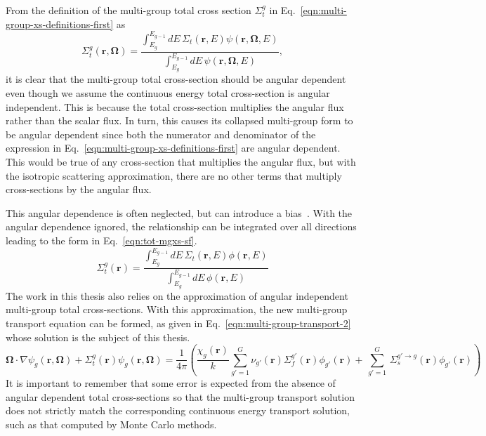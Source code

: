 \begin{appendices}
From the definition of the multi-group total cross section $\Sigma_{t}^g$ in Eq.~\ref{eqn:multi-group-xs-definitions-first} as 
\begin{equation}
\nonumber
\Sigma_{t}^g(\mathbf{r},\mathbf{\Omega}) = \frac{\int_{E_{g}}^{E_{g-1}} dE \, \Sigma_{t}(\mathbf{r},E)\psi(\mathbf{r},\mathbf{\Omega},E)}{\int_{E_{g}}^{E_{g-1}} dE \, \psi(\mathbf{r},\mathbf{\Omega},E)} ,
\end{equation}
it is clear that the multi-group total cross-section should be angular dependent even though we assume the continuous energy total cross-section is angular independent. This is because the total cross-section multiplies the angular flux rather than the scalar flux. In turn, this causes its collapsed multi-group form to be angular dependent since both the numerator and denominator of the expression in Eq.~\ref{eqn:multi-group-xs-definitions-first} are angular dependent. This would be true of any cross-section that multiplies the angular flux, but with the isotropic scattering approximation, there are no other terms that multiply cross-sections by the angular flux.

This angular dependence is often neglected, but can introduce a bias~\cite{gibson-preprint}. With the angular dependence ignored, the relationship can be integrated over all directions leading to the form in Eq.~\ref{eqn:tot-mgxs-sf}.
\begin{equation}
\Sigma_{t}^g(\mathbf{r}) = \frac{\int_{E_{g}}^{E_{g-1}} dE \, \Sigma_{t}(\mathbf{r},E)\phi(\mathbf{r},E)}{\int_{E_{g}}^{E_{g-1}} dE \, \phi(\mathbf{r},E)} 
\label{eqn:tot-mgxs-sf}
\end{equation}
The work in this thesis also relies on the approximation of angular independent multi-group total cross-sections. With this approximation, the new multi-group transport equation can be formed, as given in Eq.~\ref{eqn:multi-group-transport-2} whose solution is the subject of this thesis. 
\begin{equation}
\mathbf{\Omega} \cdot \nabla \psi_{g}(\mathbf{r},\mathbf{\Omega}) + \Sigma_t^{g}(\mathbf{r}) \psi_{g}(\mathbf{r},\mathbf{\Omega}) = \frac{1}{4 \pi} \left( \frac{\chi_{g}\left(\mathbf{r}\right)}{k} \sum_{g'=1}^{G} \nu_{g'}\left(\mathbf{r}\right) \Sigma_f^{g'}\left(\mathbf{r}\right) \phi_{g'}\left(\mathbf{r}\right) + \, \sum_{g'=1}^G \,  \Sigma_{s}^{g' \rightarrow g}\left(\mathbf{r}\right) \phi_{g'}(\mathbf{r}) \right)
\label{eqn:multi-group-transport-2}
\end{equation}
It is important to remember that some error is expected from the absence of angular dependent total cross-sections so that the multi-group transport solution does not strictly match the corresponding continuous energy transport solution, such as that computed by Monte Carlo methods.


\end{appendices}
